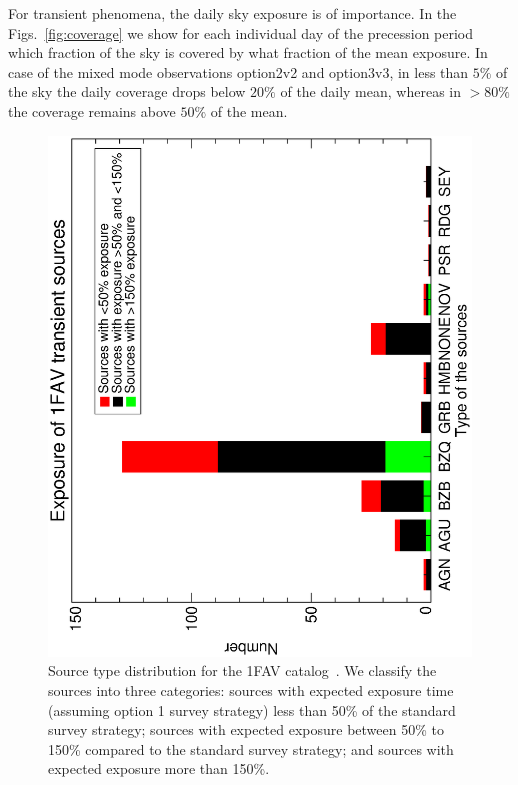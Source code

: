 \documentclass[aps,prd,superscriptaddress,nofootinbib,fixlfloat, 12pt]{revtex4-1}
\begin{document}
For transient phenomena, the daily sky exposure is of importance. In the
Figs.~\ref{fig:coverage} we show for each individual day of the precession
period which fraction of the sky is covered by what fraction of the mean
exposure. In case of the mixed mode observations option2v2 and option3v3, in
less than $5\%$ of the sky the daily coverage drops below $20\%$ of the daily
mean, whereas in $>80\%$ the coverage remains above $50\%$ of the mean.

\begin{figure}[t]
  \begin{center}
    \includegraphics[width=0.7\linewidth, angle=-90]{plots/source_type_hist.ps}
    \vspace{-0.5cm}
  \end{center}
  \caption{Source type distribution for the 1FAV catalog~\cite{1FAV:2013}. We classify the sources into three categories: sources with expected exposure time (assuming option 1 survey strategy) less than 50\% of the standard survey strategy; sources with expected exposure between 50\% to 150\% compared to the standard survey strategy; and sources with expected exposure more than 150\%. }
  \label{fig:transhist}
\end{figure}
\end{document}
